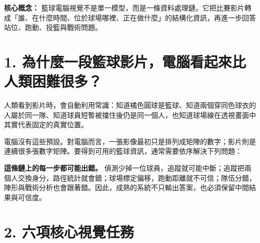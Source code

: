 \documentclass[11pt,a4paper,oneside]{report}
\begin{document}
\begin{heroBox}
\textbf{核心概念：}\quad
籃球電腦視覺不是單一模型，而是一條資料處理鏈。它把比賽影片轉成「誰、在什麼時間、位於球場哪裡、正在做什麼」的結構化資訊，再進一步回答站位、跑動、投籃與戰術問題。
\end{heroBox}

\section*{1. 為什麼一段籃球影片，電腦看起來比人類困難很多？}

人類看到影片時，會自動利用常識：知道橘色圓球是籃球、知道兩個穿同色球衣的人屬於同一隊、知道球員短暫被擋住後仍是同一個人，也知道球場線在透視畫面中其實代表固定的真實位置。

電腦沒有這些預設。對電腦而言，一張影像最初只是排列成矩陣的數字；影片則是連續很多張數字矩陣。要得到可用的籃球資訊，通常需要依序解決下列問題：

\begin{center}
\end{center}

\begin{plainBox}
\textbf{這條鏈上的每一步都可能出錯。}\quad
偵測少掉一位球員，追蹤就可能中斷；追蹤把兩個人交換身分，路徑統計就會錯；球場標定偏移，跑動距離就不可信；隊伍分錯，陣形與戰術分析也會跟著錯。因此，成熟的系統不只輸出答案，也必須保留中間結果與可信度。
\end{plainBox}

\section*{2. 六項核心視覺任務}
\end{document}
